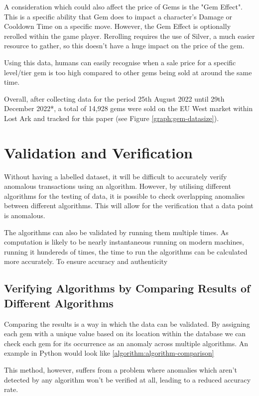 \documentclass[journal]{IEEEtran}
\begin{document}
A consideration which could also affect the price of Gems is the "Gem Effect". This is a specific ability that Gem does to impact a character's Damage or Cooldown Time on a specific move. However, the Gem Effect is optionally rerolled within the game player. Rerolling requires the use of Silver, a much easier resource to gather, so this doesn't have a huge impact on the price of the gem.

Using this data, humans can easily recognise when a sale price for a specific level/tier gem is too high compared to other gems being sold at around the same time.

Overall, after collecting data for the period 25th August 2022 until 29th December 2022*, a total of 14,928 gems were sold on the EU West market within Lost Ark and tracked for this paper (see Figure \ref{graph:gem-datasize}).

\section{Validation and Verification}
\noindent Without having a labelled dataset, it will be difficult to accurately verify anomalous transactions using an algorithm. However, by utilising different algorithms for the testing of data, it is possible to check overlapping anomalies between different algorithms. This will allow for the verification that a data point is anomalous.

The algorithms can also be validated by running them multiple times. As computation is likely to be nearly instantaneous running on modern machines, running it hundereds of times, the time to run the algorithms can be calculated more accurately. To ensure accuracy and authenticity

\subsection{Verifying Algorithms by Comparing Results of Different Algorithms}
\noindent Comparing the results is a way in which the data can be validated. By assigning each gem with a unique value based on its location within the database we can check each gem for its occurrence as an anomaly across multiple algorithms. An example in Python would look like \ref{algorithm:algorithm-comparison}

This method, however, suffers from a problem where anomalies which aren't detected by any algorithm won't be verified at all, leading to a reduced accuracy rate.
\end{document}
